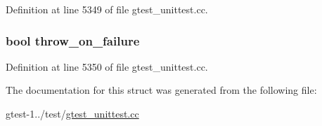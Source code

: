 \-Definition at line 5349 of file gtest\-\_\-unittest.\-cc.

\hypertarget{structtesting_1_1Flags_a46c8d0dfe16e27106e4794dfcd7b821c}{
\subsubsection[{throw\-\_\-on\-\_\-failure}]{\setlength{\rightskip}{0pt plus 5cm}bool {\bf throw\-\_\-on\-\_\-failure}}}\label{d6/d20/structtesting_1_1Flags_a46c8d0dfe16e27106e4794dfcd7b821c}


\-Definition at line 5350 of file gtest\-\_\-unittest.\-cc.



\-The documentation for this struct was generated from the following file\-:\begin{DoxyCompactItemize}
\item 
gtest-\/1../test/\hyperlink{gtest__unittest_8cc}{gtest\-\_\-unittest.\-cc}\end{DoxyCompactItemize}
